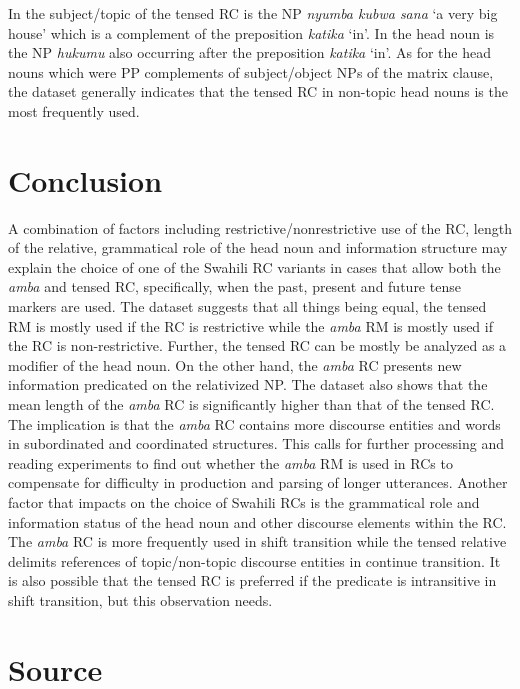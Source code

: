 \documentclass[output=paper,colorlinks,citecolor=brown]{langscibook}
\begin{document}
In  the subject/topic of the tensed RC is the NP \textit{nyumba kubwa sana} ‘a very big house’ which is a complement of the preposition \textit{katika} ‘in’. In  the head noun is the NP \textit{hukumu} also occurring after the preposition \textit{katika} ‘in’. As for the head nouns which were PP complements of subject/object NPs of the matrix clause, the dataset generally indicates that the tensed RC in non-topic head nouns is the most frequently used.

\section{Conclusion}\label{sec:mwamzandi:5}

A combination of factors including restrictive/nonrestrictive use of the RC, length of the relative, grammatical role of the head noun and information structure may explain the choice of one of the Swahili RC variants in cases that allow both the \textit{amba} and tensed RC, specifically, when the past, present and future tense markers are used. The dataset suggests that all things being equal, the tensed RM is mostly used if the RC is restrictive while the \textit{amba} RM is mostly used if the RC is non-restrictive. Further, the tensed RC can be mostly be analyzed as a modifier of the head noun. On the other hand, the \textit{amba} RC presents new information predicated on the relativized NP. The dataset also shows that the mean length of the \textit{amba} RC is significantly higher than that of the tensed RC. The implication is that the \textit{amba} RC contains more discourse entities and words in subordinated and coordinated structures. This calls for further processing and reading experiments to find out whether the \textit{amba} RM is used in RCs to compensate for difficulty in production and parsing of longer utterances. Another factor that impacts on the choice of Swahili RCs is the grammatical role and information status of the head noun and other discourse elements within the RC. The \textit{amba} RC is more frequently used in shift transition while the tensed relative delimits references of topic/non-topic discourse entities in continue transition. It is also possible that the tensed RC is preferred if the predicate is intransitive in shift transition, but this observation needs.

\section*{Source}
\end{document}
